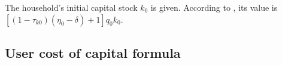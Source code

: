 %

The household's initial capital stock $k_0$ is given.  According
to , its value is
$ [(1-\tau_{k0})(\eta_0 - \delta)+ 1] q_0 k_0$.

\subsection{User cost of capital formula}

